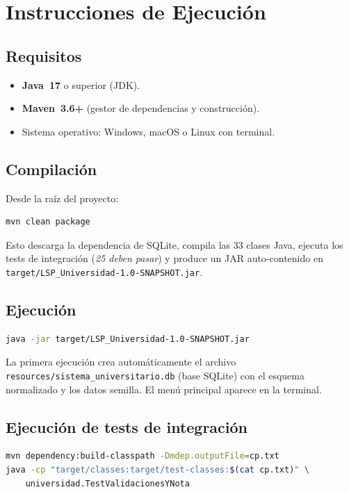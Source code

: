 \documentclass[12pt,a4paper]{article}
\begin{document}
\section{Instrucciones de Ejecución}

\subsection{Requisitos}

\begin{itemize}
    \item \textbf{Java~17} o superior (JDK).
    \item \textbf{Maven~3.6+} (gestor de dependencias y construcción).
    \item Sistema operativo: Windows, macOS o Linux con terminal.
\end{itemize}

\subsection{Compilación}

Desde la raíz del proyecto:

\begin{lstlisting}[language=bash]
mvn clean package
\end{lstlisting}

Esto descarga la dependencia de SQLite, compila las 33 clases Java, ejecuta
los tests de integración (\emph{25 deben pasar}) y produce un JAR
auto-contenido en \texttt{target/LSP\_Universidad-1.0-SNAPSHOT.jar}.

\subsection{Ejecución}

\begin{lstlisting}[language=bash]
java -jar target/LSP_Universidad-1.0-SNAPSHOT.jar
\end{lstlisting}

La primera ejecución crea automáticamente el archivo
\texttt{resources/sistema\_universitario.db} (base SQLite) con el esquema
normalizado y los datos semilla. El menú principal aparece en la terminal.

\subsection{Ejecución de tests de integración}

\begin{lstlisting}[language=bash]
mvn dependency:build-classpath -Dmdep.outputFile=cp.txt
java -cp "target/classes:target/test-classes:$(cat cp.txt)" \
    universidad.TestValidacionesYNota
\end{lstlisting}
\end{document}
